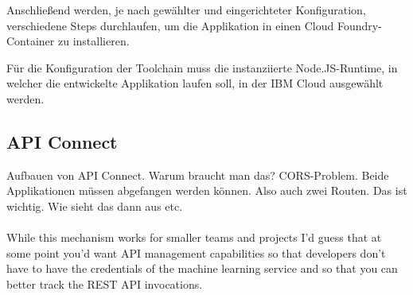 Anschließend werden, je nach gewählter und eingerichteter Konfiguration, verschiedene Steps durchlaufen, um die Applikation
in einen Cloud Foundry-Container zu installieren.

Für die Konfiguration der Toolchain muss die instanziierte Node.JS-Runtime, in welcher die entwickelte Applikation laufen
soll, in der IBM Cloud ausgewählt werden.

\subsection{API Connect}
Aufbauen von API Connect. Warum braucht man das? CORS-Problem. Beide Applikationen müssen abgefangen werden können. Also
auch zwei Routen. Das ist wichtig. Wie sieht das dann aus etc.
\\ \\
While this mechanism works for smaller teams and projects I’d guess that at some point you’d want API management
capabilities so that developers don’t have to have the credentials of the machine learning service and so that you can
better track the REST API invocations.